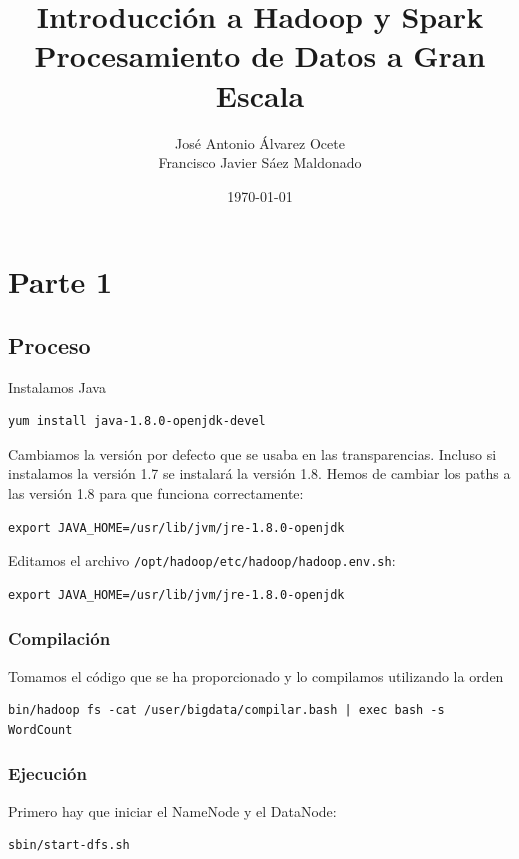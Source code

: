 \documentclass[11pt]{article}
\author{José Antonio Álvarez Ocete\\ Francisco Javier Sáez Maldonado}
\date{\today}
\title{Introducción a Hadoop y Spark\\\medskip
\large Procesamiento de Datos a Gran Escala}
\def\inline{\lstinline[basicstyle=\ttfamily,keywordstyle={}]}
\begin{document}
\maketitle

\tableofcontents

\section{Parte 1}

\subsection{Proceso}

Instalamos Java


\begin{verbatim}
yum install java-1.8.0-openjdk-devel
\end{verbatim}

Cambiamos la versión por defecto que se usaba en las transparencias. Incluso si instalamos la versión 1.7 se instalará la versión 1.8. Hemos de cambiar los paths a las versión 1.8 para que funciona correctamente:
\begin{verbatim}
export JAVA_HOME=/usr/lib/jvm/jre-1.8.0-openjdk
\end{verbatim}

Editamos el archivo  \inline{/opt/hadoop/etc/hadoop/hadoop.env.sh}:
\begin{verbatim}
export JAVA_HOME=/usr/lib/jvm/jre-1.8.0-openjdk
\end{verbatim}



\subsubsection*{ Compilación}

Tomamos el código que se ha proporcionado y lo compilamos utilizando la orden

\begin{verbatim}
bin/hadoop fs -cat /user/bigdata/compilar.bash | exec bash -s WordCount
\end{verbatim}

\subsubsection*{ Ejecución }

Primero hay que iniciar el NameNode y el DataNode:
\begin{verbatim}
sbin/start-dfs.sh
\end{verbatim}
\end{document}
